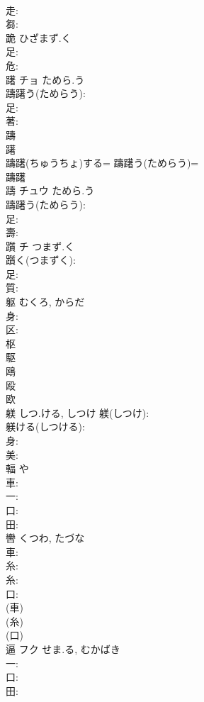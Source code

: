 \documentclass[8pt]{extreport}
\begin{document}
\begin{CJK}{UTF8}{min}
\\	走: 
\\	芻: 
\\	跪		ひざまず.く				
\\	足: 
\\	危: 
\\	躇	チョ	ためら.う		
\\	躊躇う(ためらう): 
\\	足: 
\\	著: 
\\	躊
\\	躇
\\	躊躇(ちゅうちょ)する= 躊躇う(ためらう)= 
\\	躊躇 
\\	躊	チュウ	ためら.う		
\\	躊躇う(ためらう): 
\\	足: 
\\	壽: 
\\	躓	チ	つまず.く		
\\	躓く(つまずく): 
\\	足: 
\\	質: 
\\	躯		むくろ, からだ				
\\	身: 
\\	区: 
\\	枢 
\\	駆 
\\	鴎 
\\	殴 
\\	欧 
\\	躾		しつ.ける, しつけ			躾(しつけ): 
\\	躾ける(しつける): 
\\	身: 
\\	美: 
\\	輻		や				
\\	車: 
\\	一: 
\\	口: 
\\	田: 
\\	轡		くつわ, たづな				
\\	車: 
\\	糸: 
\\	糸: 
\\	口: 
\\	(車) 
\\	(糸) 
\\	(口) 
\\	逼	フク	せま.る, むかばき		
\\	一: 
\\	口: 
\\	田: 

\end{CJK}
\end{document}
